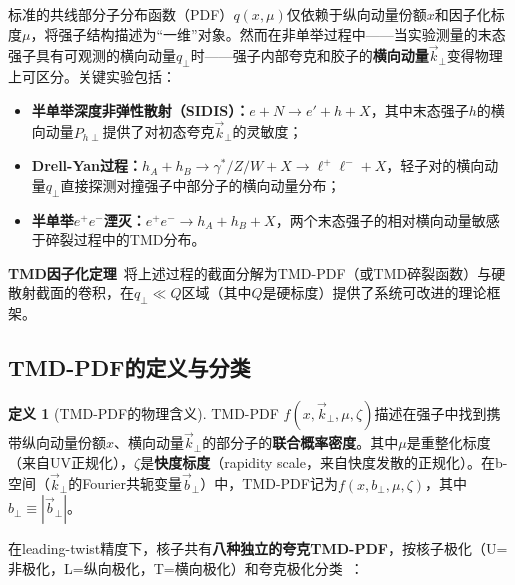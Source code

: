 \documentclass[12pt,a4paper]{ctexart}
\theoremstyle{definition}
\newtheorem{definition}{定义}[section]
\begin{document}
标准的共线部分子分布函数（PDF）$q(x,\mu)$仅依赖于纵向动量份额$x$和因子化标度$\mu$，将强子结构描述为``一维''对象。然而在非单举过程中——当实验测量的末态强子具有可观测的横向动量$q_\perp$时——强子内部夸克和胶子的\textbf{横向动量}$\vec{k}_\perp$变得物理上可区分。关键实验包括：
\begin{itemize}
    \item \textbf{半单举深度非弹性散射（SIDIS）：}$e + N \to e' + h + X$，其中末态强子$h$的横向动量$P_{h\perp}$提供了对初态夸克$\vec{k}_\perp$的灵敏度；
    \item \textbf{Drell-Yan过程：}$h_A + h_B \to \gamma^*/Z/W + X \to \ell^+\ell^- + X$，轻子对的横向动量$q_\perp$直接探测对撞强子中部分子的横向动量分布；
    \item \textbf{半单举$e^+e^-$湮灭：}$e^+e^- \to h_A + h_B + X$，两个末态强子的相对横向动量敏感于碎裂过程中的TMD分布。
\end{itemize}

\textbf{TMD因子化定理}~\cite{Collins2011foundations}将上述过程的截面分解为TMD-PDF（或TMD碎裂函数）与硬散射截面的卷积，在$q_\perp \ll Q$区域（其中$Q$是硬标度）提供了系统可改进的理论框架。

\subsection{TMD-PDF的定义与分类}

\begin{definition}[TMD-PDF的物理含义]
TMD-PDF $f(x, \vec{k}_\perp, \mu, \zeta)$描述在强子中找到携带纵向动量份额$x$、横向动量$\vec{k}_\perp$的部分子的\textbf{联合概率密度}。其中$\mu$是重整化标度（来自UV正规化），$\zeta$是\textbf{快度标度}（rapidity scale，来自快度发散的正规化）。在b-空间（$\vec{k}_\perp$的Fourier共轭变量$\vec{b}_\perp$）中，TMD-PDF记为$f(x, b_\perp, \mu, \zeta)$，其中$b_\perp \equiv |\vec{b}_\perp|$。
\end{definition}

在leading-twist精度下，核子共有\textbf{八种独立的夸克TMD-PDF}，按核子极化（U=非极化，L=纵向极化，T=横向极化）和夸克极化分类~\cite{Ma2025BoerMulders,Meissner2007TMD}：
\end{document}
